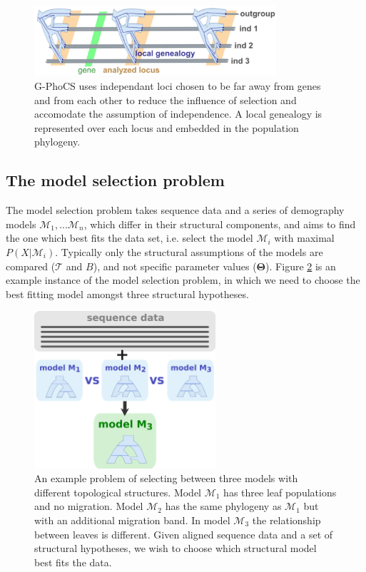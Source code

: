\documentclass[11pt]{article}
\newcommand{\vect}[1]{\boldsymbol{\mathbf{#1}}}
\newcommand{\M}{\mathcal{M}}
\newcommand{\Tr}{\mathcal{T}}
\newcommand{\T}{\vect{\Theta}}
\newcommand{\1}{\mathbbm{1}}
\newcommand{\gp}{G-PhoCS }
\begin{document}
\begin{figure}[h]
\centering
\includegraphics[width=0.8\textwidth]
{multiple_loci_across_sequence}
\captionsetup{width=.8\textwidth}
\caption{\gp uses independant loci chosen to be far away from genes and from each other to reduce the influence of selection and accomodate the assumption of independence. A local genealogy is represented over each locus and embedded in the population phylogeny.}
\label{fig:multiple_loci_across_sequence}
\end{figure}


\subsection{The model selection problem} \label{The Model Selection Problem}

The model selection problem takes sequence data and a series of demography models $\M_1,... \M_n$, which differ in their structural components, and aims to find the one which best fits the data set, i.e. select the model $\M_i$ with maximal $P(X|\M_i)$. Typically only the structural assumptions of the models are compared ($\Tr$ and $B$), and not specific parameter values ($\T$). Figure \ref{fig:model_A__OR__model_b} is an example instance of the model selection problem, in which we need to choose the best fitting model amongst three structural hypotheses.


\begin{figure}[h]
\centering
\includegraphics[width=0.6\textwidth]
{by_ilan/probgen_3_model_selection}
\captionsetup{width=.8\textwidth}
\caption{An example problem of selecting between three models with different topological structures. Model $\M_1$ has three leaf populations and no migration. Model $\M_2$ has the same phylogeny as $\M_1$ but with an additional migration band. In model $\M_3$ the relationship between leaves is different. 
%
Given aligned sequence data and a set of structural hypotheses, we wish to choose which structural model best fits the data.}
\label{fig:model_A__OR__model_b}
\end{figure}
\end{document}
